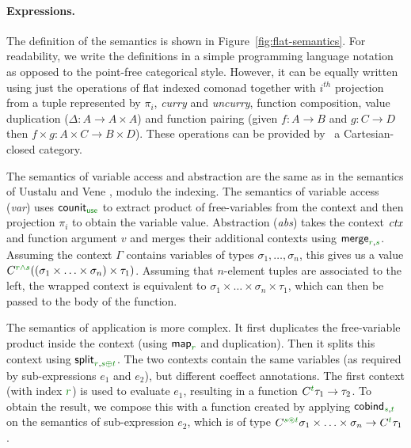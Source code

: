 \paragraph{Expressions.}
The definition of the semantics is shown in Figure~\ref{fig:flat-semantics}. For readability, we 
write the definitions in a simple programming language notation as opposed to the point-free 
categorical style. However, it can be equally written using just the operations of flat indexed 
comonad together with $i^{th}$ projection from a tuple represented by $\pi_i$, \emph{curry} and 
\emph{uncurry}, function composition, value duplication ($\Delta : A \rightarrow A \times A$) and 
function pairing (given $f:A\rightarrow B$ and $g:C\rightarrow D$ then $f\times g : A\times C \rightarrow B \times D$). 
These operations can be provided by \eg~a Cartesian-closed category.

The semantics of variable access and abstraction are the same as in the semantics of Uustalu and 
Vene \cite{comonads-notions}, modulo the indexing. The semantics of variable access (\emph{var}) uses 
$\ident{counit}_{\cunit}$ to extract product of free-variables from the context and then projection
$\pi_i$ to obtain the variable value. Abstraction (\emph{abs}) takes the context $\textit{ctx}$ and function argument 
$v$ and merges their additional contexts using $\ident{merge}_{\cclrd{r}, \cclrd{s}}$. Assuming
the context $\Gamma$ contains variables of types $\sigma_1, \ldots, \sigma_n$, this gives us a 
value $\ctyp{\cclrd{r}\czip\cclrd{s}}((\sigma_1 \times \ldots \times \sigma_n) \times \tau_1)$.
Assuming that $n$-element tuples are associated to the left, the wrapped context is equivalent to
$\sigma_1 \times \ldots \times \sigma_n \times \tau_1$, which can then be passed to the body of the
function.

The semantics of application is more complex. It first duplicates the free-variable product inside the 
context (using $\ident{map}_{\cclrd{r}}$ and duplication). Then it splits this context using 
$\ident{split}_{\cclrd{r}, \cclrd{s} \cpar \cclrd{t}}$. The two contexts contain the same variables
(as required by sub-expressions $e_1$ and $e_2$), but different coeffect annotations. The first
context (with index $\cclrd{r}$) is used to evaluate $e_1$, resulting in a function 
$\ctyp{\cclrd{t}}{\tau_1} \rightarrow \tau_2$. To obtain the result, we compose this with a function
created by applying $\ident{cobind}_{\cclrd{s}, \cclrd{t}}$ on the semantics of sub-expression
$e_2$, which is of type $\ctyp{\cclrd{s}\cseq\cclrd{t}}{\sigma_1 \times \ldots \times \sigma_n}
\rightarrow \ctyp{\cclrd{t}}{\tau_1}$.

